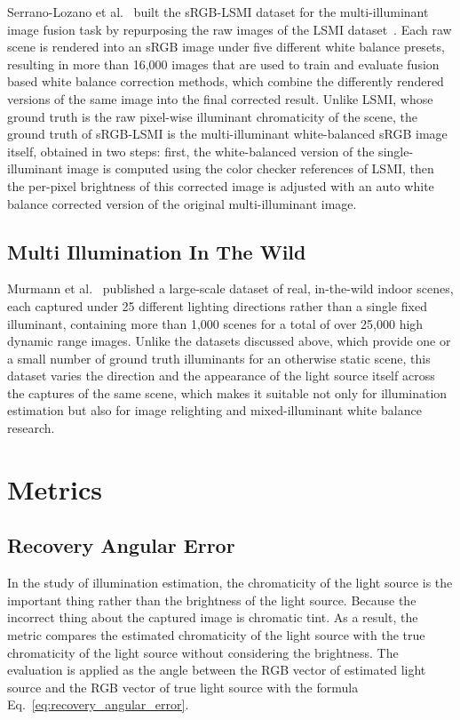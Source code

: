 Serrano-Lozano et al.~\cite{revisitingImageFusionRenderedWB} built the sRGB-LSMI dataset for the multi-illuminant image fusion task by repurposing the raw images of the LSMI dataset~\cite{kim2021lsmi}. Each raw scene is rendered into an sRGB image under five different white balance presets, resulting in more than 16,000 images that are used to train and evaluate fusion based white balance correction methods, which combine the differently rendered versions of the same image into the final corrected result. Unlike LSMI, whose ground truth is the raw pixel-wise illuminant chromaticity of the scene, the ground truth of sRGB-LSMI is the multi-illuminant white-balanced sRGB image itself, obtained in two steps: first, the white-balanced version of the single-illuminant image is computed using the color checker references of LSMI, then the per-pixel brightness of this corrected image is adjusted with an auto white balance corrected version of the original multi-illuminant image.

\subsection{Multi Illumination In The Wild}

Murmann et al.~\cite{multiIlluminationInTheWild} published a large-scale dataset of real, in-the-wild indoor scenes, each captured under 25 different lighting directions rather than a single fixed illuminant, containing more than 1,000 scenes for a total of over 25,000 high dynamic range images. Unlike the datasets discussed above, which provide one or a small number of ground truth illuminants for an otherwise static scene, this dataset varies the direction and the appearance of the light source itself across the captures of the same scene, which makes it suitable not only for illumination estimation but also for image relighting and mixed-illuminant white balance research.

\section{Metrics}

\subsection{Recovery Angular Error}

In the study of illumination estimation, the chromaticity of the light source is the important thing rather than the brightness of the light source. Because the incorrect thing about the captured image is chromatic tint. As a result, the metric compares the estimated chromaticity of the light source with the true chromaticity of the light source without considering the brightness. The evaluation is applied as the angle between the RGB vector of estimated light source and the RGB vector of true light source with the formula Eq.~\ref{eq:recovery_angular_error}.

